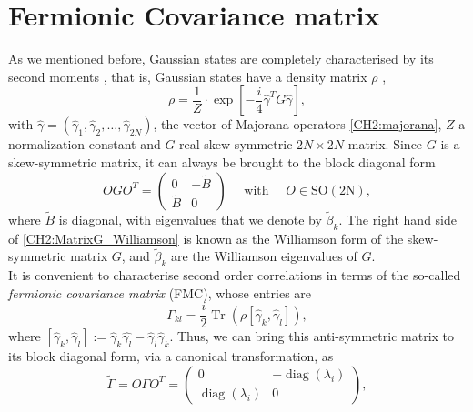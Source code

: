 \section{Fermionic Covariance matrix }
As we mentioned before, Gaussian states are completely characterised by its second moments \cite{westwanski_general_1973,molinari_notes_2017}, that is, Gaussian states have a density matrix $\rho$ \cite{cheong_many-body_2003},
\begin{equation}
\rho= \frac{1}{Z} \cdot \exp \left[-\frac{i}{4} \hat{\gamma}^{T} G \hat{\gamma}\right],
\label{CH2:rho_gaussiano_exp}
\end{equation}
with $\hat{\gamma} = (\hat{\gamma}_1,\hat{\gamma}_2,\ldots,\hat{\gamma}_{2N})$, the vector of Majorana operators \eqref{CH2:majorana}, $Z$ a normalization constant and $G$ real skew-symmetric $2N\times 2N$ matrix. Since $G$ is a skew-symmetric matrix, it can always be brought to the block diagonal form 
\begin{equation}
O G O^{T}=\left(\begin{array}{cc}
0 & -\tilde{B} \\
\tilde{B} & 0
\end{array}\right) \quad \text { with } \quad O \in \mathrm{SO}(2 \mathrm{N}),
\label{CH2:MatrixG_Williamson}
\end{equation}
where $\tilde{B}$ is diagonal, with eigenvalues that we denote by $\tilde{\beta}_k$. The right hand side of \eqref{CH2:MatrixG_Williamson} is known as the Williamson form of the skew-symmetric matrix $G$, and $\tilde{\beta}_k$ are the Williamson eigenvalues of $G$\cite{kraus_pairing_2009}.\\
\indent It is convenient to characterise second order correlations in terms of the so-called \textit{fermionic covariance matrix} (FMC), whose entries are
\begin{equation}
\Gamma_{k l}=\frac{i}{2} \operatorname{Tr}\left(\rho\left[\hat{\gamma}_{k}, \hat{\gamma}_{l}\right]\right),
\label{CH2:Cov_matrix_elements}
\end{equation}
where $\left[\hat{\gamma}_{k}, \hat{\gamma}_{l}\right] := \hat{\gamma}_{k}\hat{\gamma_{l}} - \hat{\gamma}_{l}\hat{\gamma}_{k}$. Thus, we can bring this anti-symmetric matrix to its block diagonal form, via a canonical transformation, as
\begin{equation}
\tilde{\Gamma} = O \Gamma O^{T}=\left(\begin{array}{cc}
0 & -\operatorname{diag}(\lambda_{i}) \\
\operatorname{diag}(\lambda_{i}) & 0
\end{array}\right),
\label{CH2:Williamson_Cov_fermionic_matrix}
\end{equation}
